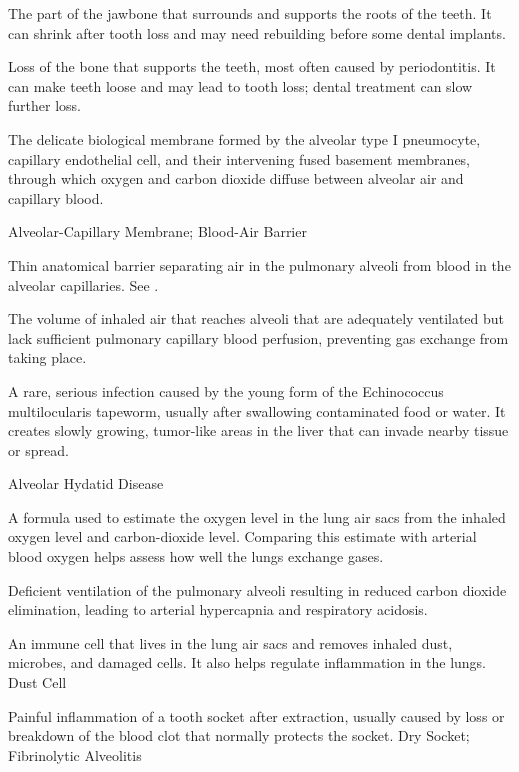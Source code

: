  The part of the jawbone that surrounds and supports the roots of the teeth. It can shrink after tooth loss and may need rebuilding before some dental implants.

 Loss of the bone that supports the teeth, most often caused by periodontitis. It can make teeth loose and may lead to tooth loss; dental treatment can slow further loss.

 The delicate biological membrane formed by the alveolar type I pneumocyte, capillary endothelial cell, and their intervening fused basement membranes, through which oxygen and carbon dioxide diffuse between alveolar air and capillary blood.

\synonyms
Alveolar-Capillary Membrane; Blood-Air Barrier

 Thin anatomical barrier separating air in the pulmonary alveoli from blood in the alveolar capillaries. See .

 The volume of inhaled air that reaches alveoli that are adequately ventilated but lack sufficient pulmonary capillary blood perfusion, preventing gas exchange from taking place.

 A rare, serious infection caused by the young form of the Echinococcus multilocularis tapeworm, usually after swallowing contaminated food or water. It creates slowly growing, tumor-like areas in the liver that can invade nearby tissue or spread.

\synonyms
Alveolar Hydatid Disease

 A formula used to estimate the oxygen level in the lung air sacs from the inhaled oxygen level and carbon-dioxide level. Comparing this estimate with arterial blood oxygen helps assess how well the lungs exchange gases.

 Deficient ventilation of the pulmonary alveoli resulting in reduced carbon dioxide elimination, leading to arterial hypercapnia and respiratory acidosis.

 An immune cell that lives in the lung air sacs and removes inhaled dust, microbes, and damaged cells. It also helps regulate inflammation in the lungs.
\synonyms
Dust Cell

 Painful inflammation of a tooth socket after extraction, usually caused by loss or breakdown of the blood clot that normally protects the socket.
\synonyms
Dry Socket; Fibrinolytic Alveolitis


